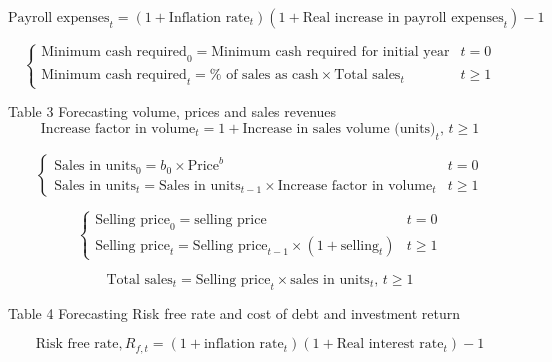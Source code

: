 \documentclass[12pt]{article}
\numberwithin{equation}{section}
\begin{document}
\begin{equation}
	\text{Payroll expenses}_{t} = (1 + \text{Inflation rate}_{t})(1+\text{Real increase in payroll expenses}_{t})-1
\end{equation}

\begin{equation}
	\begin{cases}
		\text{Minimum cash required}_{0} = \text{Minimum cash required for initial year} & t=0 \\
		\text{Minimum cash required}_{t} = \% \text{ of sales as cash} \times \text{Total sales}_{t} & t \geq 1
	\end{cases}
\end{equation}

Table 3 Forecasting volume, prices and sales revenues
\begin{equation}
	\text{Increase factor in volume}_{t} = 1 + \text{Increase in sales volume (units)}_{t}, \, t \geq 1
\end{equation}

\begin{equation}
	\begin{cases}
		\text{Sales in units}_{0} = b_{0} \times \text{Price}^{b} & t=0 \\
		\text{Sales in units}_{t} = \text{Sales in units}_{t-1} \times \text{Increase factor in volume}_{t} & t \geq 1
	\end{cases}
\end{equation}

\begin{equation}
	\begin{cases}
		\text{Selling price}_{0} = \text{selling price} & t=0 \\
		\text{Selling price}_{t} = \text{Selling price}_{t-1} \times (1 + \text{selling}_{t}) & t \geq 1
	\end{cases}
\end{equation}

\begin{equation}
	\text{Total sales}_{t} = \text{Selling price}_{t} \times \text{sales in units}_{t}, \, t \geq 1
\end{equation}

Table 4 Forecasting Risk free rate and cost of debt and investment return

\begin{equation}
	\text{Risk free rate}, R_{f,t} = (1 + \text{inflation rate}_{t})(1 + \text{Real interest rate}_{t}) - 1
\end{equation}
\end{document}
